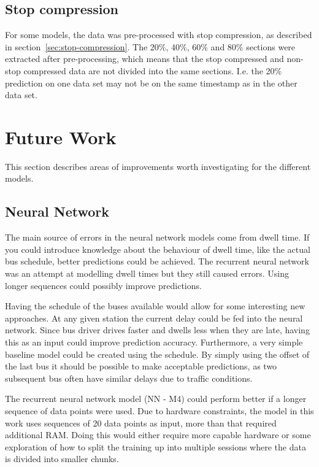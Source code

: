 \subsection{Stop compression}
For some models, the data was pre-processed with stop compression, as described in section~\ref{sec:stop-compression}. The 20\%, 40\%, 60\% and 80\% sections were extracted after pre-processing, which means that the stop compressed and non-stop compressed data are not divided into the same sections. I.e. the 20\% prediction on one data set may not be on the same timestamp as in the other data set.

\section{Future Work}
\label{sec:future-work}
This section describes areas of improvements worth investigating for the different models.

\subsection{Neural Network}
The main source of errors in the neural network models come from dwell time. If you could introduce knowledge about the behaviour of dwell time, like the actual bus schedule, better predictions could be achieved. The recurrent neural network was an attempt at modelling dwell times but they still caused errors. Using longer sequences could possibly improve predictions.

Having the schedule of the buses available would allow for some interesting new approaches. At any given station the current delay could be fed into the neural network. Since bus driver drives faster and dwells less when they are late, having this as an input could improve prediction accuracy. Furthermore, a very simple baseline model could be created using the schedule. By simply using the offset of the last bus it should be possible to make acceptable predictions, as two subsequent bus often have similar delays due to traffic conditions.

The recurrent neural network model (NN - M4) could perform better if a longer sequence of data points were used. Due to hardware constraints, the model in this work uses sequences of 20 data points as input, more than that required additional RAM. Doing this would either require more capable hardware or some exploration of how to split the training up into multiple sessions where the data is divided into smaller chunks.

